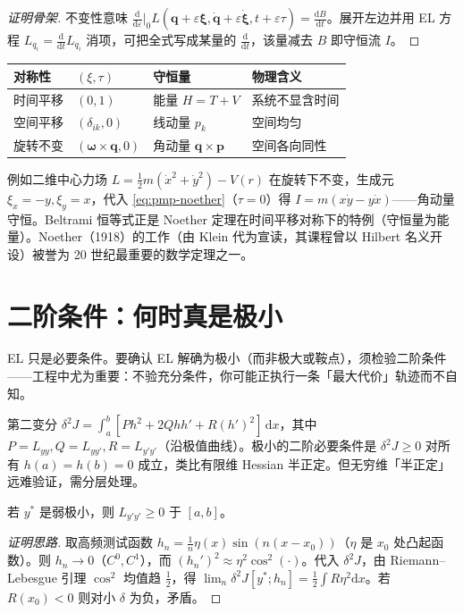 \begin{proof}[证明骨架]
不变性意味 $\tfrac{\mathrm d}{\mathrm d\varepsilon}|_0 L(\mathbf q+\varepsilon\boldsymbol\xi,\dot{\mathbf q}+\varepsilon\dot{\boldsymbol\xi},t+\varepsilon\tau)=\tfrac{\mathrm dB}{\mathrm dt}$。展开左边并用 EL 方程 $L_{q_i}=\tfrac{\mathrm d}{\mathrm dt}L_{\dot q_i}$ 消项，可把全式写成某量的 $\tfrac{\mathrm d}{\mathrm dt}$，该量减去 $B$ 即守恒流 $I$。
\end{proof}

\begin{center}\small
\begin{tabular}{llll}
\toprule
对称性 & $(\xi,\tau)$ & 守恒量 & 物理含义\\
\midrule
时间平移 & $(0,1)$ & 能量 $H=T+V$ & 系统不显含时间\\
空间平移 & $(\delta_{ik},0)$ & 线动量 $p_k$ & 空间均匀\\
旋转不变 & $(\boldsymbol\omega\times\mathbf q,0)$ & 角动量 $\mathbf q\times\mathbf p$ & 空间各向同性\\
\bottomrule
\end{tabular}
\end{center}
例如二维中心力场 $L=\tfrac12 m(\dot x^2+\dot y^2)-V(r)$ 在旋转下不变，生成元 $\xi_x=-y,\xi_y=x$，代入 \cref{eq:pmp-noether}（$\tau=0$）得 $I=m(x\dot y-y\dot x)$——角动量守恒。Beltrami 恒等式正是 Noether 定理在时间平移对称下的特例（守恒量为能量）。Noether（1918）的工作\cite{noether1918invariante}（由 Klein 代为宣读，其课程曾以 Hilbert 名义开设）被誉为 20 世纪最重要的数学定理之一。

\section{二阶条件：何时真是极小}
\label{sec:pmp-second-order}

EL 只是必要条件。要确认 EL 解确为极小（而非极大或鞍点），须检验二阶条件——工程中尤为重要：不验充分条件，你可能正执行一条「最大代价」轨迹而不自知。

第二变分 $\delta^2 J=\int_a^b[Ph^2+2Qhh'+R(h')^2]\,\mathrm dx$，其中 $P=L_{yy},Q=L_{yy'},R=L_{y'y'}$（沿极值曲线）。极小的二阶必要条件是 $\delta^2 J\ge 0$ 对所有 $h(a)=h(b)=0$ 成立，类比有限维 Hessian 半正定。但无穷维「半正定」远难验证，需分层处理。

\begin{theorem}\label{thm:pmp-legendre}
若 $y^\ast$ 是弱极小，则 $L_{y'y'}\ge 0$ 于 $[a,b]$。
\end{theorem}

\begin{proof}[证明思路]
取高频测试函数 $h_n=\tfrac1n\eta(x)\sin(n(x-x_0))$（$\eta$ 是 $x_0$ 处凸起函数）。则 $h_n\to 0$（$C^0,C^1$），而 $(h_n')^2\approx\eta^2\cos^2(\cdot)$。代入 $\delta^2 J$，由 Riemann--Lebesgue 引理 $\cos^2$ 均值趋 $\tfrac12$，得 $\lim_n\delta^2 J[y^\ast;h_n]=\tfrac12\int R\eta^2\mathrm dx$。若 $R(x_0)<0$ 则对小 $\delta$ 为负，矛盾。
\end{proof}

